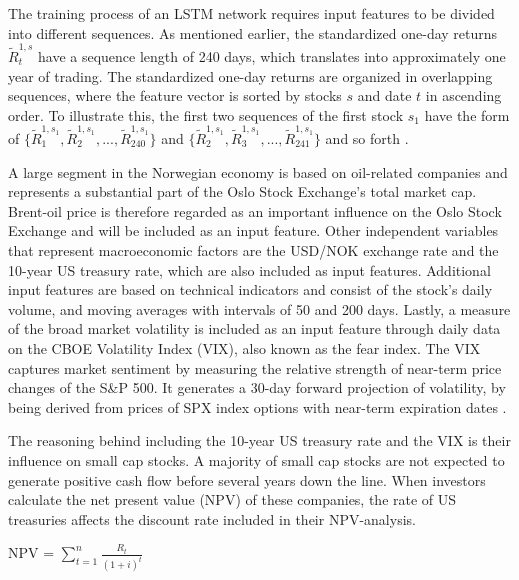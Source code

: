 \indent\newline
The training process of an LSTM network requires input features to be divided into different sequences. As mentioned earlier, the standardized one-day returns $\tilde{R}^{1,s}_{t}$ have a sequence length of 240 days, which translates into approximately one year of trading. The standardized one-day returns are organized in overlapping sequences, where the feature vector is sorted by stocks $\textit{s}$ and date $\textit{t}$ in ascending order. To illustrate this, the first two sequences of the first stock $s_{1}$ have the form of $\lbrace\tilde{R}^{1,s_{1}}_{1}, \tilde{R}^{1,s_{1}}_{2}, ..., \tilde{R}^{1,s_{1}}_{240}\rbrace$ and $\lbrace\tilde{R}^{1,s_{1}}_{2}, \tilde{R}^{1,s_{1}}_{3}, ..., \tilde{R}^{1,s_{1}}_{241}\rbrace$ and so forth \cite{krauss}. 
   

\indent\newline
A large segment in the Norwegian economy is based on oil-related companies and represents a substantial part of the Oslo Stock Exchange's total market cap. Brent-oil price is therefore regarded as an important influence on the Oslo Stock Exchange and will be included as an input feature. Other independent variables that represent macroeconomic factors are the USD/NOK exchange rate and the 10-year US treasury rate, which are also included as input features. Additional input features are based on technical indicators and consist of the stock's daily volume, and moving averages with intervals of 50 and 200 days. Lastly, a measure of the broad market volatility is included as an input feature through daily data on the CBOE Volatility Index (VIX), also known as the fear index. The VIX captures market sentiment by measuring the relative strength of near-term price changes of the S\&P 500. It generates a 30-day forward projection of volatility, by being derived from prices of SPX index options with near-term expiration dates \cite{kuepper2021}.


\indent\newline
The reasoning behind including the 10-year US treasury rate and the VIX is their influence on small cap stocks. A majority of small cap stocks are not expected to generate positive cash flow before several years down the line. When investors calculate the net present value (NPV) of these companies, the rate of US treasuries affects the discount rate included in their NPV-analysis. 

\indent\newline
NPV = $\sum_{t=1}^{n} \frac{R_{t}}{(1 + i)^{t}}$

